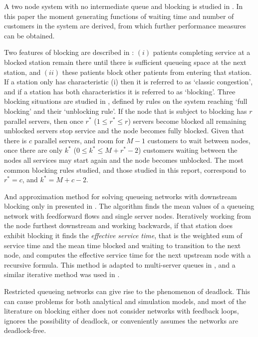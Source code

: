 \documentclass{article}
\begin{document}
A two node system with no intermediate queue and blocking is studied in \cite{aviitzhakyadin65}. In this paper the moment generating functions of waiting time and number of customers in the system are derived, from which further performance measures can be obtained.

Two features of blocking are described in \cite{koizumietal05}: $(i)$ patients completing service at a blocked station remain there until there is sufficient queueing space at the next station, and $(ii)$ these patients block other patients from entering that station.
If a station only has characteristic (i) then it is referred to as `classic congestion', and if a station has both characteristics it is referred to as `blocking'.
Three blocking situations are studied in \cite{latoucheneuts80}, defined by rules on the system reaching `full blocking' and their `unblocking rule'.
If the node that is subject to blocking has $r$ parallel servers, then once $r^*$ ($1\leq r^*\leq r$) servers become blocked all remaining unblocked servers stop service and the node becomes fully blocked.
Given that there is $c$ parallel servers, and room for $M - 1$ customers to wait between nodes, once there are only $k^*$ ($0\leq k^*\leq M+r^*-2$) customers waiting between the nodes all services may start again and the node becomes unblocked.
The most common blocking rules studied, and those studied in this report, correspond to $r^* = c$, and $k^* = M + c - 2$.

And approximation method for solving queueing networks with downstream blocking only in presented in \cite{takahashi80}.
The algorithm finds the mean values of a queueing network with feedforward flows and single server nodes.
Iteratively working from the node furthest downstream and working backwards, if that station does exhibit blocking it finds the \textit{effective service time}, that is the weighted sum of service time and the mean time blocked and waiting to transition to the next node, and computes the effective service time for the next upstream node with a recursive formula.
This method is adapted to multi-server queues in \cite{koizumietal05}, and a similar iterative method was used in \cite{korporaaletal00}.

Restricted queueing networks can give rise to the phenomenon of deadlock.
This can cause problems for both analytical and simulation models, and most of the literature on blocking either does not consider networks with feedback loops, ignores the possibility of deadlock, or conveniently assumes the networks are
deadlock-free.
\end{document}
